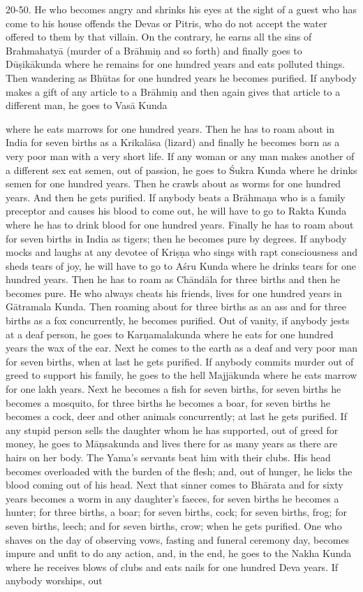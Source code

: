 20-50. He who becomes angry and shrinks his eyes at the sight of a guest who has come to his house offends the Devas or Pitris, who do not accept the water offered to them by that villain. On the contrary, he earns all the sins of Brahmahaty\=a (murder of a Br\=ahmi\d{n} and so forth) and finally goes to D\=u\d{s}ik\=akunda where he remains for one hundred years and eats polluted things. Then wandering as Bh\=utas for one hundred years he becomes purified. If anybody makes a gift of any article to a Br\=ahmi\d{n} and then again gives that article to a different man, he goes to Vas\=a Kunda

where he eats marrows for one hundred years. Then he has to roam about in India for seven births as a Krikal\=asa (lizard) and finally he becomes born as a very poor man with a very short life. If any woman or any man makes another of a different sex eat semen, out of passion, he goes to \'Sukra Kunda where he drinks semen for one hundred years. Then he crawls about as worms for one hundred years. And then he gets purified. If anybody beats a Br\=ahma\d{n}a who is a family preceptor and causes his blood to come out, he will have to go to Rakta Kunda where he has to drink blood for one hundred years. Finally he has to roam about for seven births in India as tigers; then he becomes pure by degrees. If anybody mocks and laughs at any devotee of Kri\d{s}\d{n}a who sings with rapt consciousness and sheds tears of joy, he will have to go to A\'sru Kunda where he drinks tears for one hundred years. Then he has to roam as Ch\=and\=ala for three births and then he becomes pure. He who always cheats his friends, lives for one hundred years in G\=atramala Kunda. Then roaming about for three births as an ass and for three births as a fox concurrently, he becomes purified. Out of vanity, if anybody jests at a deaf person, he goes to Kar\d{n}amalakunda where he eats for one hundred years the wax of the ear. Next he comes to the earth as a deaf and very poor man for seven births, when at last he gets purified. If anybody commits murder out of greed to support his family, he goes to the hell Majj\=akunda where he eats marrow for one lakh years. Next he becomes a fish for seven births, for seven births he becomes a mosquito, for three births he becomes a boar, for seven births he becomes a cock, deer and other animals concurrently; at last he gets purified. If any stupid person sells the daughter whom he has supported, out of greed for money, he goes to M\=a\d{n}sakunda and lives there for as many years as there are hairs on her body. The Yama's servants beat him with their clubs. His head becomes overloaded with the burden of the flesh; and, out of hunger, he licks the blood coming out of his head. Next that sinner comes to Bh\=arata and for sixty years becomes a worm in any daughter's faeces, for seven births he becomes a hunter; for three births, a boar; for seven births, cock; for seven births, frog; for seven births, leech; and for seven births, crow; when he gets purified. One who shaves on the day of observing vows, fasting and funeral ceremony day, becomes impure and unfit to do any action, and, in the end, he goes to the Nakha Kunda where he receives blows of clubs and eats nails for one hundred Deva years. If anybody worships, out 
